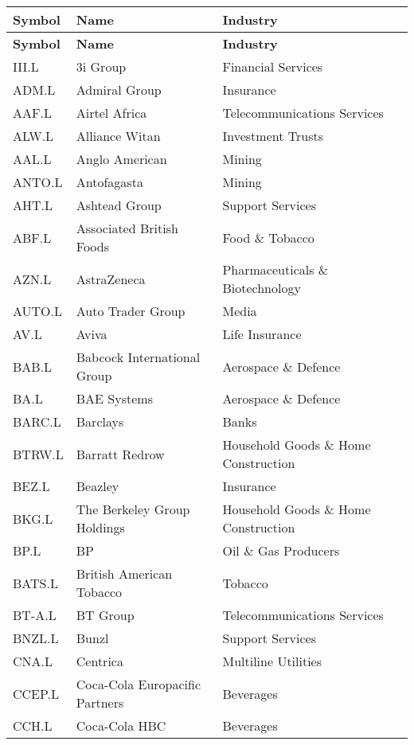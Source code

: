 \begin{longtable}{|p{2cm}|p{4cm}|p{6cm}|}
\hline
\textbf{Symbol} & \textbf{Name} & \textbf{Industry} \\
\endfirsthead

\hline
\textbf{Symbol} & \textbf{Name} & \textbf{Industry} \\
\endhead

\endfoot

\hline
III.L & 3i Group & Financial Services \\ \hline
ADM.L & Admiral Group & Insurance \\ \hline
AAF.L & Airtel Africa & Telecommunications Services \\ \hline
ALW.L & Alliance Witan & Investment Trusts \\ \hline
AAL.L & Anglo American & Mining \\ \hline
ANTO.L & Antofagasta & Mining \\ \hline
AHT.L & Ashtead Group & Support Services \\ \hline
ABF.L & Associated British Foods & Food \& Tobacco \\ \hline
AZN.L & AstraZeneca & Pharmaceuticals \& Biotechnology \\ \hline
AUTO.L & Auto Trader Group & Media \\ \hline
AV.L & Aviva & Life Insurance \\ \hline
BAB.L & Babcock International Group & Aerospace \& Defence \\ \hline
BA.L & BAE Systems & Aerospace \& Defence \\ \hline
BARC.L & Barclays & Banks \\ \hline
BTRW.L & Barratt Redrow & Household Goods \& Home Construction \\ \hline
BEZ.L & Beazley & Insurance \\ \hline
BKG.L & The Berkeley Group Holdings & Household Goods \& Home Construction \\ \hline
BP.L & BP & Oil \& Gas Producers \\ \hline
BATS.L & British American Tobacco & Tobacco \\ \hline
BT-A.L & BT Group & Telecommunications Services \\ \hline
BNZL.L & Bunzl & Support Services \\ \hline
CNA.L & Centrica & Multiline Utilities \\ \hline
CCEP.L & Coca-Cola Europacific Partners & Beverages \\ \hline
CCH.L & Coca-Cola HBC & Beverages \\ \hline

\end{longtable}
